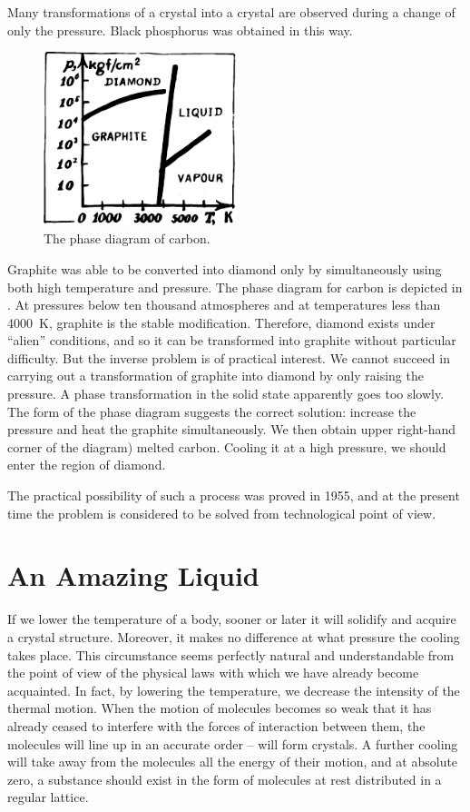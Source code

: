 Many transformations of a crystal into a crystal are observed during a change of only the pressure. Black phosphorus was obtained in this way.
\begin{figure}[!ht]
\centering
\includegraphics[width=0.5\textwidth]{figures/fig-04-13.pdf}
\caption{The phase diagram of carbon.}
\label{fig-4.13}
\end{figure}
Graphite was able to be converted into diamond only by simultaneously using both high temperature and pressure. The phase diagram for carbon is depicted in . At pressures below ten thousand atmospheres and at tem­peratures less than \SI{4000}{\kelvin}, graphite is the stable modi­fication. Therefore, diamond exists under “alien” con­ditions, and so it can be transformed into graphite without particular difficulty. But the inverse problem is of prac­tical interest. We cannot succeed in carrying out a transformation of graphite into diamond by only raising the pressure. A phase transformation in the solid state apparently goes too slowly. The form of the phase diagram suggests the correct solution: increase the pressure and heat the graphite simultaneously. We then obtain upper
right-hand corner of the diagram) melted carbon. Cooling it at a high pressure, we should enter the region of dia­mond.

The practical possibility of such a process was proved in 1955, and at the present time the problem is considered to be solved from technological point of view.

\section{An Amazing Liquid}

If we lower the temperature of a body, sooner or later it will solidify and acquire a crystal structure. Moreover, it makes no difference at what pressure the cooling takes place. This circumstance seems perfectly natural and understandable from the point of view of the physical laws with which we have already become acquainted. In fact, by lowering the temperature, we decrease the intensity of the thermal motion. When the motion of molecules becomes so weak that it has already ceased to interfere with the forces of interaction between them, the molecules will line up in an accurate order -- will form crystals. A further cooling will take away from the mole­cules all the energy of their motion, and at absolute zero, a substance should exist in the form of molecules at rest distributed in a regular lattice.

